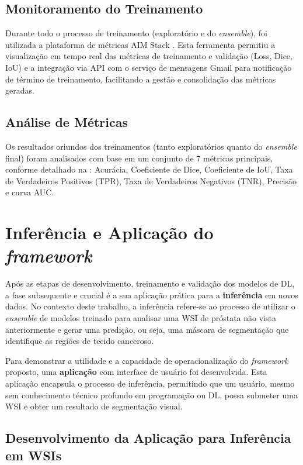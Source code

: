 \subsection{Monitoramento do Treinamento}\label{subsec:met_aim_logger}
Durante todo o processo de treinamento (exploratório e do \textit{ensemble}), foi utilizada a plataforma de métricas AIM Stack \cite{Arakelyan2020}. Esta ferramenta permitiu a visualização em tempo real das métricas de treinamento e validação (Loss, Dice, IoU) e a integração via API com o serviço de mensagens Gmail \cite{Gmail2024} para notificação de término de treinamento, facilitando a gestão e consolidação das métricas geradas.

\subsection{Análise de Métricas}\label{subsec:met_analise_metricas_finais}
Os resultados oriundos dos treinamentos (tanto exploratórios quanto do \textit{ensemble} final) foram analisados com base em um conjunto de 7 métricas principais, conforme detalhado na : Acurácia, Coeficiente de Dice, Coeficiente de IoU, Taxa de Verdadeiros Positivos (TPR), Taxa de Verdadeiros Negativos (TNR), Precisão e curva AUC.

\section{Inferência e Aplicação do \textit{framework}}\label{sec:met_inferencia_app} %

Após as etapas de desenvolvimento, treinamento e validação dos modelos de DL, a fase subsequente e crucial é a sua aplicação prática para a \textbf{inferência} em novos dados. No contexto deste trabalho, a inferência refere-se ao processo de utilizar o \textit{ensemble} de modelos treinado para analisar uma WSI de próstata não vista anteriormente e gerar uma predição, ou seja, uma máscara de segmentação que identifique as regiões de tecido canceroso. 

Para demonstrar a utilidade e a capacidade de operacionalização do \textit{framework} proposto, uma \textbf{aplicação} com interface de usuário foi desenvolvida. Esta aplicação encapsula o processo de inferência, permitindo que um usuário, mesmo sem conhecimento técnico profundo em programação ou DL, possa submeter uma WSI e obter um resultado de segmentação visual.

\subsection{Desenvolvimento da Aplicação para Inferência em WSIs}\label{subsec:met_app_streamlit} %

